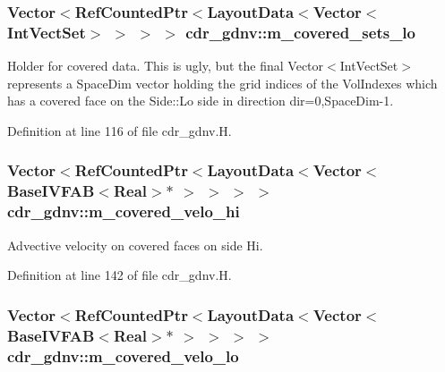 \subsubsection[{\texorpdfstring{m\+\_\+covered\+\_\+sets\+\_\+lo}{m_covered_sets_lo}}]{\setlength{\rightskip}{0pt plus 5cm}Vector$<$Ref\+Counted\+Ptr$<$Layout\+Data$<$Vector$<$Int\+Vect\+Set$>$ $>$ $>$ $>$ cdr\+\_\+gdnv\+::m\+\_\+covered\+\_\+sets\+\_\+lo\hspace{0.3cm}{\ttfamily [protected]}}\hypertarget{classcdr__gdnv_a39304f0c4be896ed71116bc936e485ad}{}\label{classcdr__gdnv_a39304f0c4be896ed71116bc936e485ad}


Holder for covered data. This is ugly, but the final Vector$<$\+Int\+Vect\+Set$>$ represents a Space\+Dim vector holding the grid indices of the Vol\+Indexes which has a covered face on the Side\+::\+Lo side in direction dir=0,Space\+Dim-\/1. 



Definition at line 116 of file cdr\+\_\+gdnv.\+H.

\subsubsection[{\texorpdfstring{m\+\_\+covered\+\_\+velo\+\_\+hi}{m_covered_velo_hi}}]{\setlength{\rightskip}{0pt plus 5cm}Vector$<$Ref\+Counted\+Ptr$<$Layout\+Data$<$Vector$<$Base\+I\+V\+F\+AB$<$Real$>$$\ast$ $>$ $>$ $>$ $>$ cdr\+\_\+gdnv\+::m\+\_\+covered\+\_\+velo\+\_\+hi\hspace{0.3cm}{\ttfamily [protected]}}\hypertarget{classcdr__gdnv_a0bd70710cada49c3dd5ab1b65e427dcf}{}\label{classcdr__gdnv_a0bd70710cada49c3dd5ab1b65e427dcf}


Advective velocity on covered faces on side Hi. 



Definition at line 142 of file cdr\+\_\+gdnv.\+H.

\subsubsection[{\texorpdfstring{m\+\_\+covered\+\_\+velo\+\_\+lo}{m_covered_velo_lo}}]{\setlength{\rightskip}{0pt plus 5cm}Vector$<$Ref\+Counted\+Ptr$<$Layout\+Data$<$Vector$<$Base\+I\+V\+F\+AB$<$Real$>$$\ast$ $>$ $>$ $>$ $>$ cdr\+\_\+gdnv\+::m\+\_\+covered\+\_\+velo\+\_\+lo\hspace{0.3cm}{\ttfamily [protected]}}\hypertarget{classcdr__gdnv_a5c2a6fbb4832b38430c82e0903d728b9}{}\label{classcdr__gdnv_a5c2a6fbb4832b38430c82e0903d728b9}


